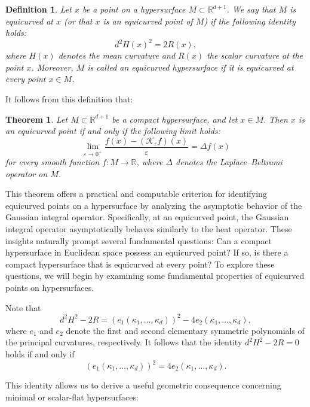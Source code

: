 \documentclass{amsart}
\theoremstyle{Theorem}
\newtheorem{defn}[theorem]{Definition}
\newtheorem{thm}[theorem]{Theorem}
\theoremstyle{remark}
\numberwithin{equation}{section} \numberwithin{figure}{section}
\renewcommand*{\to}{\rightarrow}
\begin{document}
\begin{defn}
Let \( x \) be a point on a hypersurface \( M \subset \mathbb{R}^{d+1} \). We say that \( M \) is \emph{equicurved at \( x \)} (or that \( x \) is an \emph{equicurved point} of \( M \)) if the following identity holds:
\[
d^2 H(x)^2 = 2 R(x),
\]
where \( H(x) \) denotes the mean curvature and \( R(x) \) the scalar curvature at the point \( x \). Moreover, \( M \) is called an \emph{equicurved hypersurface} if it is equicurved at every point \( x \in M \).
\end{defn}

It follows from this definition that:

\begin{thm}\label{ck}
Let \( M \subset \mathbb{R}^{d+1} \) be a compact hypersurface, and let \( x \in M \). Then \( x \) is an equicurved point if and only if the following limit holds:
\[
\lim_{\varepsilon \to 0^+} \frac{f(x) - (\mathcal{K}_\varepsilon f)(x)}{\varepsilon} = \Delta f(x)
\]
for every smooth function \( f : M \to \mathbb{R} \), where \( \Delta \) denotes the Laplace–Beltrami operator on \( M \).
\end{thm}

This theorem offers a practical and computable criterion for identifying equicurved points on a hypersurface by analyzing the asymptotic behavior of the Gaussian integral operator. Specifically, at an equicurved point, the Gaussian integral operator asymptotically behaves similarly to the heat operator.
These insights naturally prompt several fundamental questions: Can a compact hypersurface in Euclidean space possess an equicurved point? If so, is there a compact hypersurface that is equicurved at every point?
To explore these questions, we will begin by examining some fundamental properties of equicurved points on hypersurfaces.


Note that
\[
d^2 H^2 - 2 R = \left( e_1(\kappa_1, \dots, \kappa_d) \right)^2 - 4 e_2(\kappa_1, \dots, \kappa_d),
\]
where \( e_1 \) and \( e_2 \) denote the first and second elementary symmetric polynomials of the principal curvatures, respectively.
It follows that the identity \( d^2 H^2 - 2 R = 0 \) holds if and only if
\begin{equation}\label{e1e2}
\left( e_1(\kappa_1, \dots, \kappa_d) \right)^2 = 4 e_2(\kappa_1, \dots, \kappa_d).
\end{equation}

This identity allows us to derive a useful geometric consequence concerning minimal or scalar-flat hypersurfaces:
\end{document}
